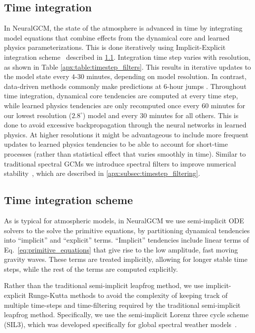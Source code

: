 \documentclass[sn-nature,Numbered]{sn-jnl}%
\begin{document}
\begin{appendices}
\section{Time integration}\label{apx:sec:time_integration}
In NeuralGCM, the state of the atmosphere is advanced in time by integrating model equations that combine effects from the dynamical core and learned physics parameterizations. This is done iteratively using Implicit-Explicit integration scheme~\cite{whitaker2013implicit} described in \ref{apx:subsec:sil3}. Integration time step varies with resolution, as shown in Table \ref{apx:table:timestep_filters}. This results in iterative updates to the model state every $4$-$30$ minutes, depending on model resolution. In contrast, data-driven methods commonly make predictions at $6$-hour jumps \cite{lam2022graphcast,keisler2022forecasting}.
Throughout time integration, dynamical core tendencies are computed at every time step, while learned physics tendencies are only recomputed once every $60$ minutes for our lowest resolution ($2.8^{\circ}$) model and every $30$ minutes for all others. This is done to avoid excessive backpropagation through the neural networks in learned physics. At higher resolutions it might be advantageous to include more frequent updates to learned physics tendencies to be able to account for short-time processes (rather than statistical effect that varies smoothly in time). 
Similar to traditional spectral GCMs we introduce spectral filters to improve numerical stability~, which are described in \ref{apx:subsec:timestep_filtering}.

\subsection{Time integration scheme}\label{apx:subsec:sil3}

As is typical for atmospheric models, in NeuralGCM we use semi-implicit ODE solvers to the solve the primitive equations, by partitioning dynamical tendencies into ``implicit'' and ``explicit'' terms. ``Implicit'' tendencies include linear terms of Eq.~\ref{eq:primitive_equations} that give rise to the low amplitude, fast moving gravity waves. These terms are treated implicitly, allowing for longer stable time steps, while the rest of the terms are computed explicitly.

Rather than the traditional semi-implicit leapfrog method, we use implicit-explicit Runge-Kutta methods to avoid the complexity of keeping track of multiple time-steps and time-filtering required by the traditional semi-implicit leapfrog method.
Specifically, we use the semi-implicit Lorenz three cycle scheme (SIL3), which was developed specifically for global spectral weather models~\cite{whitaker2013implicit}. 



\end{appendices}
\end{document}
